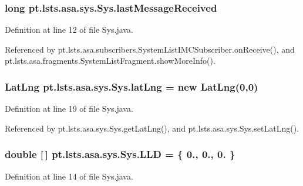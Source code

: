 \subsubsection[{last\+Message\+Received}]{\setlength{\rightskip}{0pt plus 5cm}long pt.\+lsts.\+asa.\+sys.\+Sys.\+last\+Message\+Received}\label{classpt_1_1lsts_1_1asa_1_1sys_1_1Sys_ac6b2954f1dadd92dd574ae9c6af2a2e5}


Definition at line 12 of file Sys.\+java.



Referenced by pt.\+lsts.\+asa.\+subscribers.\+System\+List\+I\+M\+C\+Subscriber.\+on\+Receive(), and pt.\+lsts.\+asa.\+fragments.\+System\+List\+Fragment.\+show\+More\+Info().

\hypertarget{classpt_1_1lsts_1_1asa_1_1sys_1_1Sys_af1aaba346d090fae8aabf5c809245fd2}{}
\subsubsection[{lat\+Lng}]{\setlength{\rightskip}{0pt plus 5cm}Lat\+Lng pt.\+lsts.\+asa.\+sys.\+Sys.\+lat\+Lng = new Lat\+Lng(0,0)\hspace{0.3cm}{\ttfamily [private]}}\label{classpt_1_1lsts_1_1asa_1_1sys_1_1Sys_af1aaba346d090fae8aabf5c809245fd2}


Definition at line 19 of file Sys.\+java.



Referenced by pt.\+lsts.\+asa.\+sys.\+Sys.\+get\+Lat\+Lng(), and pt.\+lsts.\+asa.\+sys.\+Sys.\+set\+Lat\+Lng().

\hypertarget{classpt_1_1lsts_1_1asa_1_1sys_1_1Sys_a7b0e04954a2efba7989aba9124b2cd40}{}
\subsubsection[{L\+L\+D}]{\setlength{\rightskip}{0pt plus 5cm}double \mbox{[}$\,$\mbox{]} pt.\+lsts.\+asa.\+sys.\+Sys.\+L\+L\+D = \{ 0., 0., 0. \}\hspace{0.3cm}{\ttfamily [private]}}\label{classpt_1_1lsts_1_1asa_1_1sys_1_1Sys_a7b0e04954a2efba7989aba9124b2cd40}


Definition at line 14 of file Sys.\+java.



